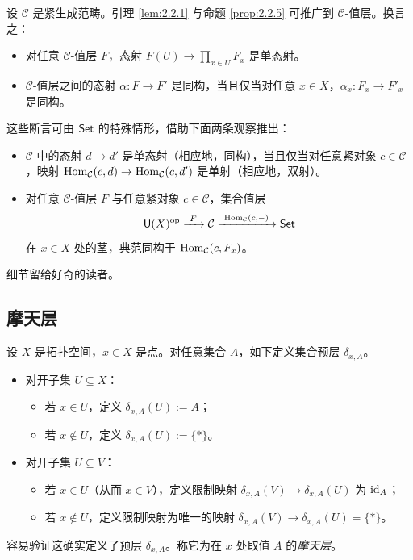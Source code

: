 \begin{remark}\label{rem:2.2.7}
设 $\mathcal C$ 是紧生成范畴。引理 \ref{lem:2.2.1} 与命题 \ref{prop:2.2.5} 可推广到 $\mathcal C$-值层。换言之：
\begin{itemize}
  \item 对任意 $\mathcal C$-值层 $F$，态射 $F(U)\to\prod_{x\in U}F_x$ 是单态射。
  \item $\mathcal C$-值层之间的态射 $\alpha\colon F\to F'$ 是同构，当且仅当对任意 $x\in X$，$\alpha_x\colon F_x\to F'_x$ 是同构。
\end{itemize}
这些断言可由 $\mathsf{Set}$ 的特殊情形，借助下面两条观察推出：
\begin{itemize}
  \item $\mathcal C$ 中的态射 $d\to d'$ 是单态射（相应地，同构），当且仅当对任意紧对象 $c\in\mathcal C$，映射 $\operatorname{Hom}_{\mathcal C}(c,d)\to\operatorname{Hom}_{\mathcal C}(c,d')$ 是单射（相应地，双射）。
  \item 对任意 $\mathcal C$-值层 $F$ 与任意紧对象 $c\in\mathcal C$，集合值层
  \[
  \smallcat U(X)^{\op}\xrightarrow{\ F\ }\mathcal C\xrightarrow{\ \Hom_{\mathcal C}(c,-)\ }\Set
  \]
  在 $x\in X$ 处的茎，典范同构于 $\operatorname{Hom}_{\mathcal C}(c,F_x)$。
\end{itemize}
细节留给好奇的读者。
\end{remark}

\subsection{摩天层}\label{sec:2.3}

\begin{definition}\label{def:2.3.1}
设 $X$ 是拓扑空间，$x\in X$ 是点。对任意集合 $A$，如下定义集合预层 $\delta_{x,A}$。
\begin{itemize}
  \item 对开子集 $U\subseteq X$：
  \begin{itemize}
    \item 若 $x\in U$，定义 $\delta_{x,A}(U):=A$；
    \item 若 $x\notin U$，定义 $\delta_{x,A}(U):=\{*\}$。
  \end{itemize}
  \item 对开子集 $U\subseteq V$：
  \begin{itemize}
    \item 若 $x\in U$（从而 $x\in V$），定义限制映射 $\delta_{x,A}(V)\to\delta_{x,A}(U)$ 为 $\operatorname{id}_A$；
    \item 若 $x\notin U$，定义限制映射为唯一的映射 $\delta_{x,A}(V)\to\delta_{x,A}(U)=\{*\}$。
  \end{itemize}
\end{itemize}
容易验证这确实定义了预层 $\delta_{x,A}$。称它为在 $x$ 处取值 $A$ 的\emph{摩天层}。
\end{definition}

